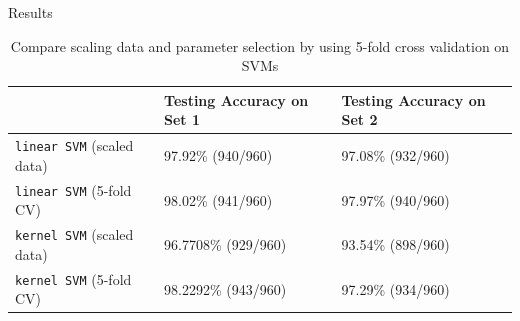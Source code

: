 \documentclass[final,hyperref={pdfpagelabels=false}]{beamer}
\begin{document}
\begin{frame}[t]
\begin{columns}[t]
\begin{column}{.465\textwidth}
\begin{block}{Results}
\begin{table}[h]
\centering
\caption{Compare scaling data and parameter selection by using 5-fold cross validation on SVMs}
\label{result2}
\begin{tabular}{l|l|l}
                                           & Testing Accuracy on Set 1 & Testing Accuracy on Set 2 \\ \hline
\texttt{linear SVM} (scaled data)                & 97.92\% (940/960)         & 97.08\% (932/960)         \\ \hline
\texttt{linear SVM} (5-fold CV) & 98.02\% (941/960)         & 97.97\% (940/960)         \\ \hline
\texttt{kernel SVM} (scaled data)                & 96.7708\% (929/960)       & 93.54\% (898/960)         \\ \hline
\texttt{kernel SVM} (5-fold CV) & 98.2292\% (943/960)       & 97.29\% (934/960)                        
\end{tabular}
\end{table}

\end{block}














\end{column}
\end{columns}
\end{frame}
\end{document}
